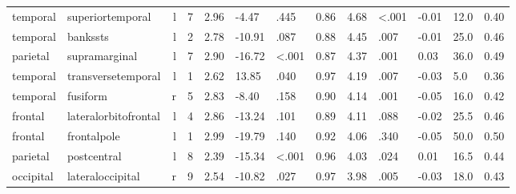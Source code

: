 \documentclass{article}
\begin{document}
\begin{longtable}{llrR{1.5cm}R{1cm}R{1.3cm}R{1cm}R{1cm}R{1.3cm}R{1cm}R{1.8cm}R{1.3cm}R{1.8cm}}
  temporal &          superiortemporal &    l &            7 &                  2.96 &            -4.47 &               .445 &                               0.86 &                          4.68 &                   \textless.001 & -0.01 &   12.0 &      0.40 \\
  temporal &                  bankssts &    l &            2 &                  2.78 &           -10.91 &               .087 &                               0.88 &                          4.45 &                            .007 & -0.01 &   25.0 &      0.46 \\
  parietal &             supramarginal &    l &            7 &                  2.90 &           -16.72 &      \textless.001 &                               0.87 &                          4.37 &                            .001 &  0.03 &   36.0 &      0.49 \\
  temporal &        transversetemporal &    l &            1 &                  2.62 &            13.85 &               .040 &                               0.97 &                          4.19 &                            .007 & -0.03 &    5.0 &      0.36 \\
  temporal &                  fusiform &    r &            5 &                  2.83 &            -8.40 &               .158 &                               0.90 &                          4.14 &                            .001 & -0.05 &   16.0 &      0.42 \\
   frontal &      lateralorbitofrontal &    l &            4 &                  2.86 &           -13.24 &               .101 &                               0.89 &                          4.11 &                            .088 & -0.02 &   25.5 &      0.46 \\
   frontal &               frontalpole &    l &            1 &                  2.99 &           -19.79 &               .140 &                               0.92 &                          4.06 &                            .340 & -0.05 &   50.0 &      0.50 \\
  parietal &               postcentral &    l &            8 &                  2.39 &           -15.34 &      \textless.001 &                               0.96 &                          4.03 &                            .024 &  0.01 &   16.5 &      0.44 \\
 occipital &          lateraloccipital &    r &            9 &                  2.54 &           -10.82 &               .027 &                               0.97 &                          3.98 &                            .005 & -0.03 &   18.0 &      0.43 \\

\end{longtable}
\end{document}
